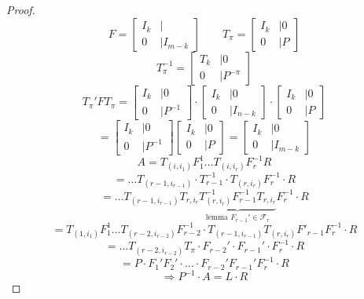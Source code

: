 \documentclass[a4paper,landscape,twocolumn]{article}
\begin{document}
\begin{proof}
  \[
    F = \begin{bmatrix}
      I_k &|  \\
    \hline
      0 &| I_{m-k}
    \end{bmatrix}
    \qquad
    T_\pi = \begin{bmatrix}
      I_k &| 0 \\
    \hline
      0 &| P
    \end{bmatrix}
  \] \[
    T_{\pi}^{-1} = \begin{bmatrix}
      T_k &| 0 \\
    \hline
      0 &| P^{-\pi}
    \end{bmatrix}
  \] \[
    T_{\pi}' F T_{\pi} = \begin{bmatrix}
      I_k &| 0 \\
      0 &| P^{-1}
    \end{bmatrix} \cdot \begin{bmatrix}
      I_k &| 0 \\
      0 &| I_{n-k}
    \end{bmatrix} \cdot \begin{bmatrix}
      I_k &| 0 \\
      0 &| P
    \end{bmatrix}
  \] \[
    = \begin{bmatrix}
      I_k &| 0 \\
      0 &| P^{-1}
    \end{bmatrix} \begin{bmatrix}
      I_k &| 0 \\
      0 &| P
    \end{bmatrix}
    =
    \begin{bmatrix}
      I_k &| 0 \\
      0 &| I_{m-k}
    \end{bmatrix}
  \] \[
    A = T_{(i,i_1)} F_1^1 \ldots T_{(i,i_r)} F_r^{-1} R
  \] \[
    = \ldots T_{(r-1, i_{r-1})} \cdot T_{r-1}^{-1} \cdot T_{(r,i_r)} F_r^{-1} \cdot R
  \] \[
    = \ldots T_{(r-1, i_{r-1})} T_{r,i_r} \underbrace{T_{(r,i_r)}^{-1} F_{r-1}^{-1} T_{r,i_r}}_{\text{lemma } F_{r-1}' \in \mathcal F_r} F_r^{-1} \cdot R
  \] \[
    = T_{(1,i_1)} F_1^1 \ldots T_{(r-2,i_{r-2})} F_{r-2}^{-1} \cdot T_{(r-1, i_{r-1})} T_{(r,i_r)} F'_{r-1} F_r^{-1} \cdot R
  \] \[
    = \ldots T_{(r-2,i_{r-2})} T_\pi \cdot F_{r-2}' \cdot F_{r-1}' \cdot F_r^{-1} \cdot R
  \] \[
    = P \cdot F_1' F_2' \cdot \ldots \cdot F_{r-2}' F_{r-1}' F_r^{-1} \cdot R
  \] \[
    \Rightarrow P^{-1} \cdot A = L \cdot R
  \]
\end{proof}
\end{document}
